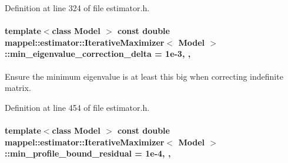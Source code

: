 Definition at line 324 of file estimator.\+h.

\paragraph[{\texorpdfstring{min\+\_\+eigenvalue\+\_\+correction\+\_\+delta}{min_eigenvalue_correction_delta}}]{\setlength{\rightskip}{0pt plus 5cm}template$<$class Model $>$ const double {\bf mappel\+::estimator\+::\+Iterative\+Maximizer}$<$ Model $>$\+::min\+\_\+eigenvalue\+\_\+correction\+\_\+delta = 1e-\/3\hspace{0.3cm}{\ttfamily [static]}, {\ttfamily [protected]}, {\ttfamily [inherited]}}\hypertarget{classmappel_1_1estimator_1_1IterativeMaximizer_a9c23c94f649688d01e9eb938a692c6f5}{}\label{classmappel_1_1estimator_1_1IterativeMaximizer_a9c23c94f649688d01e9eb938a692c6f5}


Ensure the minimum eigenvalue is at least this big when correcting indefinite matrix. 



Definition at line 454 of file estimator.\+h.

\paragraph[{\texorpdfstring{min\+\_\+profile\+\_\+bound\+\_\+residual}{min_profile_bound_residual}}]{\setlength{\rightskip}{0pt plus 5cm}template$<$class Model $>$ const double {\bf mappel\+::estimator\+::\+Iterative\+Maximizer}$<$ Model $>$\+::min\+\_\+profile\+\_\+bound\+\_\+residual = 1e-\/4\hspace{0.3cm}{\ttfamily [static]}, {\ttfamily [protected]}, {\ttfamily [inherited]}}\hypertarget{classmappel_1_1estimator_1_1IterativeMaximizer_a04b56451448fa004f4ce3da97bfde9ec}{}\label{classmappel_1_1estimator_1_1IterativeMaximizer_a04b56451448fa004f4ce3da97bfde9ec}


